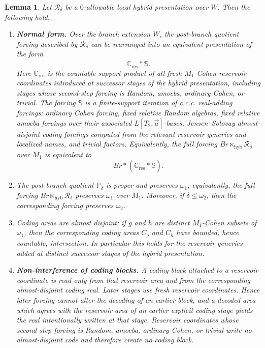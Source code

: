 \documentclass[a4paper,11pt]{article}
\newtheorem{lemma}[theorem]{Lemma}
\newcommand{\hybcomp}{\mathbin{\ltimes_{\mathrm{hyb}}}}
\begin{document}
\begin{lemma}
\label{lem:basic-zero-allowable}
Let \(\mathcal R_\delta\) be a \(0\)-allowable local hybrid presentation over \(W\).
Then the following hold.
\begin{enumerate}
   \item \textbf{Normal form.}  Over the branch extension \(W\), the
   post-branch quotient forcing described by \(\mathcal R_\delta\) can be
   rearranged into an equivalent presentation of the form
   \[
      \mathbb C_{\mathrm{res}}*\dot{\mathbb S}.
   \]
   Here \(\mathbb C_{\mathrm{res}}\) is the countable-support product of all
   fresh \(M_1\)-Cohen reservoir coordinates introduced at successor stages of
   the hybrid presentation, including stages whose second-step forcing is
   Random, amoeba, ordinary Cohen, or trivial.  The forcing \(\dot{\mathbb S}\) is a
   finite-support iteration of c.c.c. real-adding forcings: ordinary Cohen
   forcing, fixed relative Random algebras, fixed relative amoeba forcings over
   their associated \(L[T_2,\vec a]\)-bases, Jensen--Solovay almost-disjoint coding forcings
   computed from the relevant reservoir generics and localized names, and
   trivial factors.  Equivalently, the full forcing \(Br\hybcomp\mathcal R_\delta\) over \(M_1\)
   is equivalent to
   \[
      Br*(\mathbb C_{\mathrm{res}}*\dot{\mathbb S}).
   \]

   \item The post-branch quotient \(\mathbb P_\delta\) is proper and preserves \(\omega_1\); equivalently, the full forcing \(Br\hybcomp\mathcal R_\delta\) preserves \(\omega_1\) over \(M_1\).
   Moreover, if \(\delta\leq\omega_2\), then the corresponding forcing preserves \(\omega_2\).

   \item Coding areas are almost disjoint: if \(g\) and \(h\) are distinct
   \(M_1\)-Cohen subsets of \(\omega_1\), then the corresponding coding areas
   \(C_g\) and \(C_h\) have bounded, hence countable, intersection.  In
   particular this holds for the reservoir generics added at distinct successor
   stages of the hybrid presentation.

   \item \textbf{Non-interference of coding blocks.}  A coding block attached to
   a reservoir coordinate is read only from that reservoir area and from the
   corresponding almost-disjoint coding real.  Later stages use fresh reservoir
   coordinates.  Hence later forcing cannot alter the decoding of an earlier
   block, and a decoded area which agrees with the reservoir area of an earlier
   explicit coding stage yields the real intentionally written at that stage.
   Reservoir coordinates whose second-step forcing is Random, amoeba, ordinary
   Cohen, or trivial write no almost-disjoint code and therefore create no coding
   block.


\end{enumerate}
\end{lemma}
\end{document}
